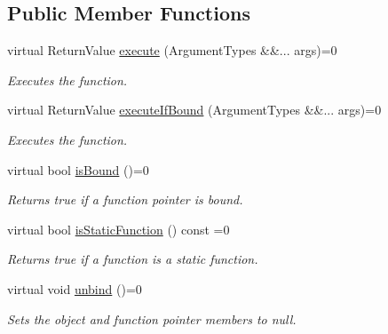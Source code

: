 \subsection*{Public Member Functions}
\begin{DoxyCompactItemize}
\item 
virtual Return\+Value \mbox{\hyperlink{class_arcana_1_1_callback_instance_aa5bd9b4ee2129a0c22a98f7fa1cfc724}{execute}} (Argument\+Types \&\&... args)=0
\begin{DoxyCompactList}\small\item\em Executes the function. \end{DoxyCompactList}\item 
virtual Return\+Value \mbox{\hyperlink{class_arcana_1_1_callback_instance_af4aced5d787cabb857931ecd87c3ab50}{execute\+If\+Bound}} (Argument\+Types \&\&... args)=0
\begin{DoxyCompactList}\small\item\em Executes the function. \end{DoxyCompactList}\item 
\mbox{\label{class_arcana_1_1_callback_instance_a017ab425cf14a399e93cef08d8dbfc71}} 
virtual bool \mbox{\hyperlink{class_arcana_1_1_callback_instance_a017ab425cf14a399e93cef08d8dbfc71}{is\+Bound}} ()=0
\begin{DoxyCompactList}\small\item\em Returns true if a function pointer is bound. \end{DoxyCompactList}\item 
\mbox{\label{class_arcana_1_1_callback_instance_a00ff80b8068277052d2814984dfec319}} 
virtual bool \mbox{\hyperlink{class_arcana_1_1_callback_instance_a00ff80b8068277052d2814984dfec319}{is\+Static\+Function}} () const =0
\begin{DoxyCompactList}\small\item\em Returns true if a function is a static function. \end{DoxyCompactList}\item 
\mbox{\label{class_arcana_1_1_callback_instance_a679d5aba1aa39d3d7609a908b35dd5f3}} 
virtual void \mbox{\hyperlink{class_arcana_1_1_callback_instance_a679d5aba1aa39d3d7609a908b35dd5f3}{unbind}} ()=0
\begin{DoxyCompactList}\small\item\em Sets the object and function pointer members to null. \end{DoxyCompactList}\item 

\end{DoxyCompactItemize}
